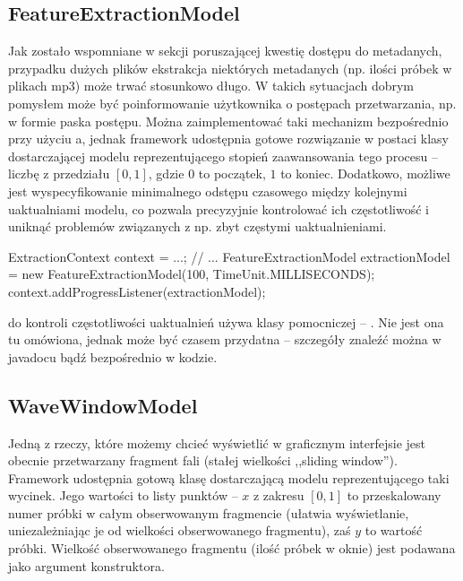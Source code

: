 \subsection{FeatureExtractionModel}

Jak zostało wspomniane w sekcji poruszającej kwestię dostępu do metadanych, przypadku dużych plików
ekstrakcja niektórych metadanych (np. ilości próbek w plikach mp3) może trwać stosunkowo długo. W
takich sytuacjach dobrym pomysłem może być poinformowanie użytkownika o postępach przetwarzania, np.
w formie paska postępu. Można zaimplementować taki mechanizm bezpośrednio przy użyciu
a, jednak framework udostępnia gotowe rozwiązanie w postaci klasy
dostarczającej modelu reprezentującego stopień zaawansowania tego procesu -- liczbę z przedziału
$[0, 1]$, gdzie $0$ to początek, $1$ to koniec. Dodatkowo, możliwe jest wyspecyfikowanie minimalnego
odstępu czasowego między kolejnymi uaktualniami modelu, co pozwala precyzyjnie kontrolować ich
częstotliwość i uniknąć problemów związanych z np. zbyt częstymi uaktualnieniami.

\begin{java}
ExtractionContext context = ...;
// ...
FeatureExtractionModel extractionModel =
        new FeatureExtractionModel(100, TimeUnit.MILLISECONDS);
context.addProgressListener(extractionModel);
\end{java}

\begin{Tip}
 do kontroli częstotliwości uaktualnień używa klasy pomocniczej --
. Nie jest ona tu omówiona, jednak może być czasem przydatna --
szczegóły znaleźć można w javadocu bądź bezpośrednio w kodzie.
\end{Tip}

\subsection{WaveWindowModel}

Jedną z rzeczy, które możemy chcieć wyświetlić w graficznym interfejsie jest obecnie przetwarzany
fragment fali (stałej wielkości ,,sliding window''). Framework udostępnia gotową klasę dostarczającą
modelu reprezentującego taki wycinek. Jego wartości to listy punktów -- $x$ z zakresu $[0, 1]$ to
przeskalowany numer próbki w całym obserwowanym fragmencie (ułatwia wyświetlanie, uniezależniając je
od wielkości obserwowanego fragmentu), zaś $y$ to wartość próbki. Wielkość obserwowanego fragmentu
(ilość próbek w oknie) jest podawana jako argument konstruktora.

